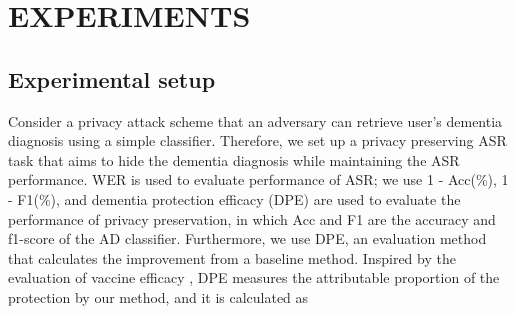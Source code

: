 \documentclass[lettersize,journal]{IEEEtran}
\begin{document}
\section{EXPERIMENTS}
\label{sec:experiments}
\subsection{Experimental setup}
Consider a privacy attack scheme that an adversary can retrieve user's dementia diagnosis using a simple classifier. Therefore, we set up a privacy preserving ASR task that aims to hide the dementia diagnosis while maintaining the ASR performance. WER is used to evaluate performance of ASR; we use 1 - Acc(\%), 1 - F1(\%), and dementia protection efficacy (DPE) are used to evaluate the performance of privacy preservation, in which Acc and F1 are the accuracy and f1-score of the AD classifier. Furthermore, we use DPE, an evaluation method that calculates the improvement from a baseline method. Inspired by the evaluation of vaccine efficacy \cite{orenstein1985field}, DPE measures the attributable proportion of the protection by our method, and it is calculated as 
\end{document}
